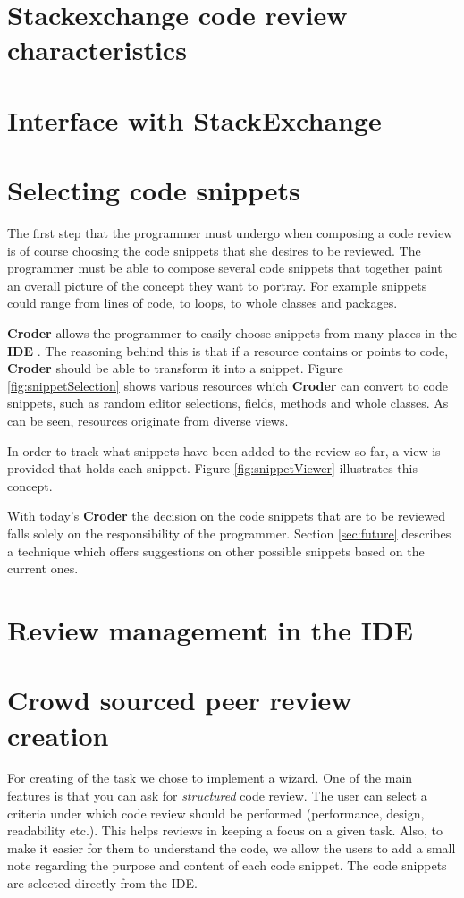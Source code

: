 \documentclass{sigchi}
\newcommand{\croder}{\textbf{Croder }}
\newcommand{\IDE}{\textbf{IDE }}
\begin{document}
\section{Stackexchange code review characteristics}
\section{Interface with StackExchange}

\section{Selecting code snippets}

 The first step that the programmer must undergo when composing a code review is of course choosing the code snippets that she desires to be reviewed. The programmer must be able to compose several code snippets that together paint an overall picture of the concept they want to portray. For example snippets could range from lines of code, to loops, to whole classes and packages.

 \croder allows the programmer to easily choose snippets from many places in the \IDE. The reasoning behind this is that if a resource contains or points to code, \croder should be able to transform it into a snippet. Figure \ref{fig:snippetSelection} shows  various resources which \croder can convert to code snippets, such as random editor selections, fields, methods and whole classes. As can be seen, resources originate from diverse views.

 In order to track what snippets have been added to the review so far, a view is provided that holds each snippet. Figure \ref{fig:snippetViewer} illustrates this concept.
 
 With today's \croder the decision on the code snippets that are to be reviewed falls solely on the responsibility of the programmer. Section \ref{sec:future} describes a technique which offers suggestions on other possible snippets based on the current ones.
 
\section{Review management in the IDE}

\section{Crowd sourced peer review creation}

For creating of the task we chose to implement a wizard. One of the main features is that you can ask
for \emph{structured} code review. The user can select a criteria under which code review should be
performed (performance, design, readability etc.). This helps reviews in keeping a focus on a given task.
Also, to make it easier for them to understand the code, we allow the users to add a small note regarding
the purpose and content of each code snippet. The code snippets are selected directly from the IDE.
\end{document}
